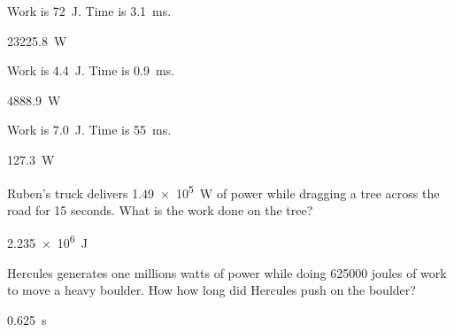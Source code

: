 \documentclass[../main-physics-problems.tex]{subfiles}
\begin{document}
\begin{questions}
\question \label{AORjkH}
Work is \SI{72}{J}. Time is \SI{3.1}{ms}.

\begin{solution}
\SI{23225.8}{W}
\end{solution}


\question \label{iKHe2E}
Work is \SI{4.4}{J}. Time is \SI{0.9}{ms}.

\begin{solution}
\SI{4888.9}{W}
\end{solution}


\question \label{bPWZDf}
Work is \SI{7.0}{J}. Time is \SI{55}{ms}.

\begin{solution}
\SI{127.3}{W}
\end{solution}


\question \label{RvNudw}
Ruben's truck delivers \SI{1.49e5}{W} of power while dragging a tree across the road for 15 seconds. What is the work done on the tree?

\begin{solution}
\SI{2.235e6}{J}
\end{solution}

\question \label{b9UIEt}
Hercules generates one millions watts of power while doing \SI{625000}{} joules of work to move a heavy boulder. How how long did Hercules push on the boulder?

\begin{solution}
\SI{0.625}{s}
\end{solution}
\end{questions}
\end{document}
